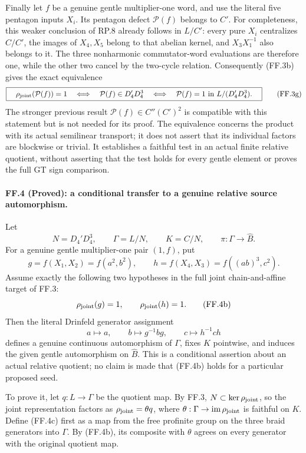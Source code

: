 Finally let $f$ be a genuine gentle multiplier-one word,
and use the literal five pentagon inputs $X_i$. Its
pentagon defect $\mathcal P(f)$ belongs to $C'$.
For completeness, this weaker conclusion of RP.8
already follows in $L/C'$: every pure $X_i$ centralizes
$C/C'$, the images of $X_4,X_5$ belong to that abelian
kernel, and $X_3X_1^{-1}$ also belongs to it.
The three nonharmonic commutator-word evaluations are
therefore one, while the other two cancel by the
two-cycle relation. Consequently (FF.3b) gives the
exact equivalence
\[
 \boxed{\quad
 \rho_{\rm joint}(\mathcal P(f))=1
 \quad\Longleftrightarrow\quad
 \mathcal P(f)\in D_4'D_4^3
 \quad\Longleftrightarrow\quad
 \mathcal P(f)=1\text{ in }L/(D_4'D_4^3).\quad}
 \tag{FF.3g}
\]
The stronger previous result $\mathcal P(f)\in
C''(C')^2$ is compatible with this statement but is
not needed for its proof. The equivalence concerns
the product with its actual semilinear transport;
it does not assert that its individual factors are
blockwise or trivial. It establishes a faithful
test in an actual finite relative quotient, without
asserting that the test holds for every gentle
element or proves the full GT sign comparison.

\paragraph{FF.4 (Proved): a conditional transfer to a genuine relative source automorphism.}
Let
\[
 N=D_4'D_4^3,\qquad \Gamma=L/N,\qquad K=C/N,
 \qquad \pi:\Gamma\longrightarrow\widehat B.
 \tag{FF.4a}
\]
For a genuine gentle multiplier-one pair $(1,f)$, put
\[
 g=f(X_1,X_2)=f(a^2,b^2),\qquad
 h=f(X_4,X_3)=f((ab)^3,c^2).
\]
Assume exactly the following two hypotheses in the full joint
chain-and-affine target of FF.3:
\[
             \rho_{\rm joint}(g)=1,
             \qquad \rho_{\rm joint}(h)=1.
 \tag{FF.4b}
\]
Then the literal Drinfeld generator assignment
\[
        a\longmapsto a,\qquad
        b\longmapsto g^{-1}bg,\qquad
        c\longmapsto h^{-1}ch
 \tag{FF.4c}
\]
defines a genuine continuous automorphism of $\Gamma$, fixes
$K$ pointwise, and induces the given gentle automorphism on
$\widehat B$. This is a conditional assertion about an actual
relative quotient; no claim is made that (FF.4b) holds for a
particular proposed seed.

To prove it, let $q:L\to\Gamma$ be the quotient map. By FF.3,
$N\subset\ker\rho_{\rm joint}$, so the joint representation
factors as $\rho_{\rm joint}=\theta q$, where
$\theta:\Gamma\to\operatorname{im}\rho_{\rm joint}$ is
faithful on $K$. Define (FF.4c) first as a map from the free
profinite group on the three braid generators into $\Gamma$.
By (FF.4b), its composite with $\theta$ agrees on every
generator with the original quotient map.

